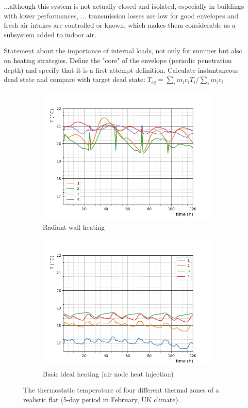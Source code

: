 \documentclass[10pt]{extarticle} %
\begin{document}
...although this system is not actually closed and isolated, especially in buildings with lower performances,  ... transmission losses are low for good envelopes and fresh air intakes are controlled or known, which makes them considerable as a subsystem added to indoor air.

Statement about the importance of internal loads, not only for summer but also on heating strategies. Define the "core" of the envelope (periodic penetration depth) and specify that it is a first attempt definition.
Calculate instantaneous dead state and compare with target dead state: $T_{eq}={\sum_i m_i c_i T_i} / {\sum_i m_i c_i}$



\begin{figure}[h]
 
\begin{subfigure}{0.5\textwidth}
\includegraphics[width=0.99\linewidth, height=7cm]{images/1.png} 
\caption{Radiant wall heating}
\label{fig:esprmodel}
\end{subfigure}
\begin{subfigure}{0.5\textwidth}
\includegraphics[width=0.99\linewidth, height=7cm]{images/2.png}
\caption{Basic ideal heating (air node heat injection)}
\label{fig:constructionelements}
\end{subfigure}
 
\caption{The thermostatic temperature of four different thermal zones of a realistic flat (5-day period in February, UK climate).}
\label{fig:casestudy}
\end{figure}
\end{document}
